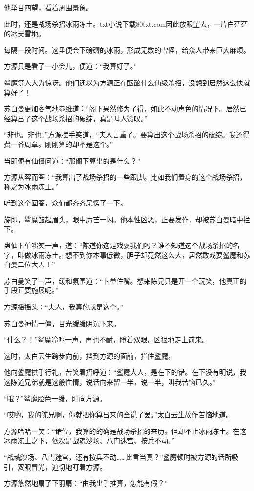 \begin{this_body}
他举目四望，看着周围景象。

此时，还是战场杀招冰雨冻土。txt小说下载80txt.com因此放眼望去，一片白茫茫的冰天雪地。

每隔一段时间。这里便会下磅礴的冰雨，形成无数的雪怪，给众人带来巨大麻烦。

方源只是看了一小会儿，便道：“我算好了。”

鲨魔等人大为惊讶。他们还以为方源正在酝酿什么仙级杀招，没想到居然这么快就算好了！

苏白曼更加客气地恭维道：“阁下果然修为了得，如此不动声色的情况下。居然已经算出了这个战场杀招的破绽，真是叫人赞叹。”

“非也。非也。”方源摆手笑道，“夫人言重了。要算出这个战场杀招的破绽。我还得费一番周章。刚刚算的却不是这个。”

当即便有仙僵问道：“那阁下算出的是什么？”

方源从容而答：“我算出了战场杀招的一些跟脚。比如我们置身的这个战场杀招，称之为冰雨冻土。”

听到这个回答，众仙都齐齐呆愣了一下。

旋即，鲨魔皱起眉头，眼中厉芒一闪。他本性凶恶，正要发作，却被苏白曼暗中拦下。

蛊仙卜单嗤笑一声，道：“陈道你这是戏耍我们吗？谁不知道这个战场杀招的名字，叫做冰雨冻土。想不到你本事低微，胆子却竟然这么大，居然敢戏耍鲨魔和苏白曼二位大人！”

苏白曼笑了一声，缓和氛围道：“卜单住嘴。想来陈兄只是开一个玩笑，他真正的手段正要施展呢。”

方源摇摇头：“夫人，我算的就是这个。”

苏白曼神情一僵，目光缓缓阴沉下来。

“什么？！”鲨魔冷哼一声，再也不耐，瞪着双眼，凶狠地走上前来。

这时，太白云生跨步向前，挡到方源的面前，拦住鲨魔。

他向鲨魔拱手行礼，苦笑着招呼道：“鲨魔大人，是在下的错。在下没有明说，我这陈道兄弟就是这般性情，说话向来留一半，说一半，叫我苦恼已久。”

“哦？”鲨魔脸色一缓，盯向方源。

“哎哟，我的陈兄啊，你就把你算出来的全说了罢。”太白云生故作苦恼地道。

方源哈哈一笑：“诸位，我算的的确是战场杀招的来历。但却不止冰雨冻土。在这冰雨冻土之下，依次是战魂沙场、八门迷宫、按兵不动。”

“战魂沙场、八门迷宫，还有按兵不动……此言当真？”鲨魔顿时被方源的话所吸引，双眼冒光，迫切地盯着方源。

方源悠然地扇了下羽扇：“由我出手推算，怎能有假？”


\end{this_body}
